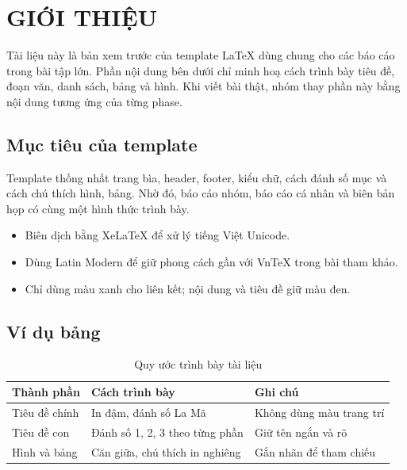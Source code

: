 \section{GIỚI THIỆU}

Tài liệu này là bản xem trước của template LaTeX dùng chung cho các báo cáo trong bài tập lớn. Phần nội dung bên dưới chỉ minh hoạ cách trình bày tiêu đề, đoạn văn, danh sách, bảng và hình. Khi viết bài thật, nhóm thay phần này bằng nội dung tương ứng của từng phase.

\subsection{Mục tiêu của template}

Template thống nhất trang bìa, header, footer, kiểu chữ, cách đánh số mục và cách chú thích hình, bảng. Nhờ đó, báo cáo nhóm, báo cáo cá nhân và biên bản họp có cùng một hình thức trình bày.

\begin{itemize}
  \item Biên dịch bằng XeLaTeX để xử lý tiếng Việt Unicode.
  \item Dùng Latin Modern để giữ phong cách gần với VnTeX trong bài tham khảo.
  \item Chỉ dùng màu xanh cho liên kết; nội dung và tiêu đề giữ màu đen.
\end{itemize}

\subsection{Ví dụ bảng}

\begin{table}[htbp]
  \centering
  \caption{Quy ước trình bày tài liệu}
  \label{tab:format-rules}
  \begin{tabularx}{\textwidth}{|C{28mm}|Y|Y|}
    \hline
    \textbf{Thành phần} & \centering\arraybackslash\textbf{Cách trình bày} & \centering\arraybackslash\textbf{Ghi chú}\\
    \hline
    Tiêu đề chính & In đậm, đánh số La Mã & Không dùng màu trang trí\\
    \hline
    Tiêu đề con & Đánh số 1, 2, 3 theo từng phần & Giữ tên ngắn và rõ\\
    \hline
    Hình và bảng & Căn giữa, chú thích in nghiêng & Gắn nhãn để tham chiếu\\
    \hline
  \end{tabularx}
\end{table}

